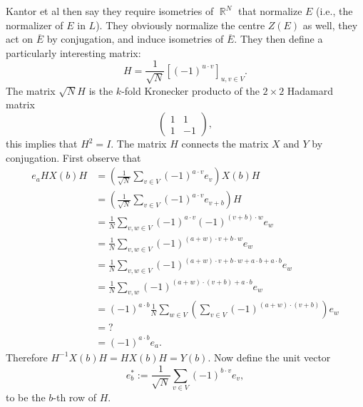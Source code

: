 \documentclass[a4paper]{article}
\DeclareMathOperator{\R}{\mathbb{R}}
\begin{document}
  Kantor et al then say they require isometries of $\R^{N}$
  that normalize $E$ (i.e., the normalizer of $E$ in $L$).
  They obviously normalize the centre $Z(E)$ as well, they
  act on $\overline{E}$ by conjugation, and induce
  isometries of $\overline{E}$. They then define a
  particularly interesting matrix:
  \begin{equation}
    H
    = \frac{1}{\sqrt{N}}
    \left[(-1)^{u \cdot v}\right]_{u,v \in V}.
  \end{equation}
  The matrix $\sqrt{N}H$ is the $k$-fold Kronecker producto
  of the $2 \times 2$ Hadamard matrix
  \[
    \begin{pmatrix} 1 & 1 \\ 1 & -1 \end{pmatrix},
  \] 
  this implies that $H^2 = I$. The matrix $H$ connects the
  matrix  $X$ and $Y$ by conjugation. First observe that
  \begin{align}
    e_a H X(b) H
    &= \left(
      \frac{1}{\sqrt{N}} \sum_{v \in V}^{}
      (-1)^{a \cdot v} e_v
    \right) X(b) H \\
    &= \left( 
      \frac{1}{\sqrt{N}}
      \sum_{v \in V}^{} (-1)^{a \cdot v} e_{v+b} 
    \right) H \\
    &= \frac{1}{N} \sum_{v, w \in V}^{} 
    (-1)^{a \cdot v} (-1)^{(v+b) \cdot w} e_{w} \\
    &= \frac{1}{N} \sum_{v,w \in V}^{} 
    (-1)^{(a + w) \cdot v + b \cdot w} e_{w} \\
    &= \frac{1}{N} \sum_{v, w \in V}^{} 
    (-1)^{(a+w) \cdot v + b \cdot w + a \cdot b + a \cdot
    b}e_w \\
    &= \frac{1}{N} \sum_{v,w}^{} 
    (-1)^{(a+w) \cdot (v + b) + a \cdot b} e_w \\
    &= (-1)^{a \cdot b} \frac{1}{N} \sum_{w \in V}^{}  
    \left( 
      \sum_{v \in V}^{} 
      (-1)^{(a+w) \cdot (v+b)} 
    \right) e_w \\
    &= ? \\
    &= (-1)^{a \cdot b} e_a.
  \end{align}
  Therefore $H^{-1} X(b) H = H X(b) H = Y(b)$. Now define
  the unit vector
  \begin{equation}
    e_b^{*}
    := \frac{1}{\sqrt{N}} \sum_{v \in V}^{}
    (-1)^{b \cdot v} e_v,
  \end{equation}
  to be the $b$-th row of $H$.
\end{document}
